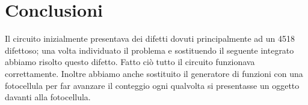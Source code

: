 \documentclass[a4paper, 10pt]{RelazioneLab}
\begin{document}
\section{Conclusioni}
Il circuito inizialmente presentava dei difetti dovuti principalmente ad un 4518 difettoso; una volta individuato il problema e sostituendo il seguente integrato abbiamo risolto questo difetto. Fatto ciò tutto il circuito funzionava correttamente. Inoltre abbiamo anche sostituito il generatore di funzioni con una fotocellula per far avanzare il conteggio ogni qualvolta si presentasse un oggetto davanti alla fotocellula. 
\end{document}
